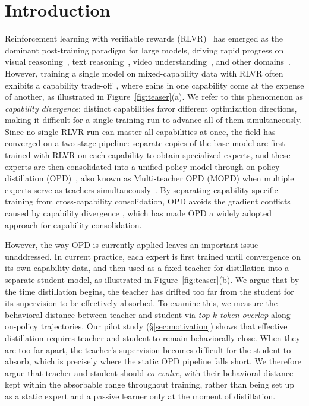 \section{Introduction}
Reinforcement learning with verifiable rewards (RLVR)~\cite{grpo,liu2025understandingr1zeroliketrainingcritical,yu2025dapoopensourcellmreinforcement,zheng2025groupsequencepolicyoptimization} has emerged as the dominant post-training paradigm for large models, driving rapid progress on visual reasoning~\cite{huang2026visionr1incentivizingreasoningcapability,yao2025r1sharevlincentivizingreasoningcapability}, text reasoning~\cite{deepseekr1,yang2025qwen3technicalreport}, video understanding~\cite{feng2025videor1,wang2025timer1posttraininglargevision}, and other domains~\cite{kimiteam2026kimik25visualagentic,glm5team2026glm5vibecodingagentic}. However, training a single model on mixed-capability data with RLVR often exhibits a capability trade-off~\cite{shukor2025scalinglawsoptimaldata}, where gains in one capability come at the expense of another, as illustrated in Figure~\ref{fig:teaser}(a). We refer to this phenomenon as \textit{capability divergence}: distinct capabilities favor different optimization directions, making it difficult for a single training run to advance all of them simultaneously. Since no single RLVR run can master all capabilities at once, the field has converged on a two-stage pipeline: separate copies of the base model are first trained with RLVR on each capability to obtain specialized experts, and these experts are then consolidated into a unified policy model through on-policy distillation (OPD)~\cite{lu2025onpolicy-opd}, also known as Multi-teacher OPD (MOPD) when multiple experts serve as teachers simultaneously~\cite{mimo2025flash-mopd,deepseekai2026deepseekv4}. By separating capability-specific training from cross-capability consolidation, OPD avoids the gradient conflicts caused by capability divergence
, which has made OPD a widely adopted approach for capability consolidation.


However, the way OPD is currently applied leaves an important issue unaddressed. In current practice, each expert is first trained until convergence on its own capability data, and then used as a fixed teacher for distillation into a separate student model, as illustrated in Figure~\ref{fig:teaser}(b). We argue that by the time distillation begins, the teacher has drifted too far from the student for its supervision to be effectively absorbed. To examine this, we measure the behavioral distance between teacher and student via \textit{top-$k$ token overlap} along on-policy trajectories. Our pilot study (\S\ref{sec:motivation}) shows that effective distillation requires teacher and student to remain behaviorally close. When they are too far apart, the teacher's supervision becomes difficult for the student to absorb, which is precisely where the static OPD pipeline falls short. We therefore argue that teacher and student should \textit{co-evolve}, with their behavioral distance kept within the absorbable range throughout training, rather than being set up as a static expert and a passive learner only at the moment of distillation.

